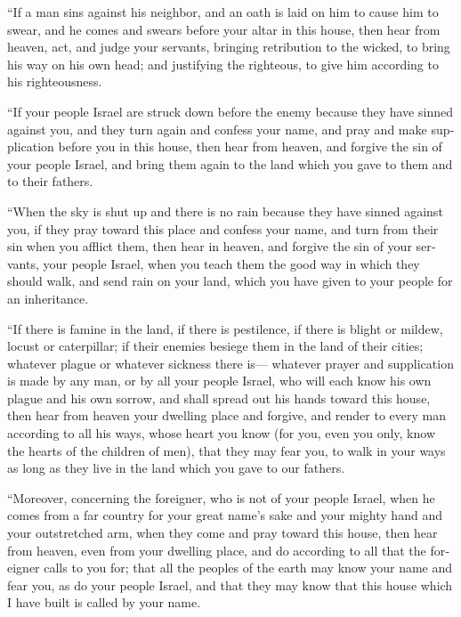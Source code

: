\begin{paracol}{2}
\begin{otherlanguage}{english}
 ``If a man sins against his neighbor, and an oath is
laid on him to cause him to swear, and he comes and swears before your
altar in this house,  then hear from heaven, act, and
judge your servants, bringing retribution to the wicked, to bring his
way on his own head; and justifying the righteous, to give him according
to his righteousness.

 ``If your people Israel are struck down before the enemy
because they have sinned against you, and they turn again and confess
your name, and pray and make supplication before you in this house,
 then hear from heaven, and forgive the sin of your
people Israel, and bring them again to the land which you gave to them
and to their fathers.

 ``When the sky is shut up and there is no rain because
they have sinned against you, if they pray toward this place and confess
your name, and turn from their sin when you afflict them,
 then hear in heaven, and forgive the sin of your
servants, your people Israel, when you teach them the good way in which
they should walk, and send rain on your land, which you have given to
your people for an inheritance.

 ``If there is famine in the land, if there is
pestilence, if there is blight or mildew, locust or caterpillar; if
their enemies besiege them in the land of their cities; whatever plague
or whatever sickness there is---  whatever prayer and
supplication is made by any man, or by all your people Israel, who will
each know his own plague and his own sorrow, and shall spread out his
hands toward this house,  then hear from heaven your
dwelling place and forgive, and render to every man according to all his
ways, whose heart you know (for you, even you only, know the hearts of
the children of men),  that they may fear you, to walk in
your ways as long as they live in the land which you gave to our
fathers.

 ``Moreover, concerning the foreigner, who is not of your
people Israel, when he comes from a far country for your great name's
sake and your mighty hand and your outstretched arm, when they come and
pray toward this house,  then hear from heaven, even from
your dwelling place, and do according to all that the foreigner calls to
you for; that all the peoples of the earth may know your name and fear
you, as do your people Israel, and that they may know that this house
which I have built is called by your name.


\end{otherlanguage}
\end{paracol}
